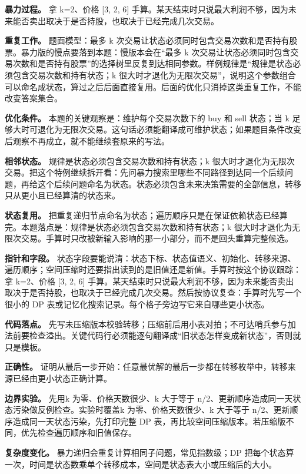\textbf{暴力过程。} 拿 k=2、价格 [3, 2, 6] 手算。某天结束时只说最大利润不够，因为未来能否卖出取决于是否持股，也取决于已经完成几次交易。

\textbf{重复工作。} 题面模型：最多 k 次交易让状态必须同时包含交易次数和是否持有股票。暴力版的慢点要落到本题：慢版本会在“最多 k 次交易让状态必须同时包含交易次数和是否持有股票”的选择树里反复到达相同参数。样例规律是“规律是状态必须包含交易次数和持有状态；k 很大时才退化为无限次交易”，说明这个参数组合可以命名成状态，算过之后后面直接复用。后面的优化只消掉这类重复工作，不能改变答案集合。

\textbf{优化条件。} 本题的关键观察是：维护每个交易次数下的 buy 和 sell 状态；当 k 足够大时可退化为无限次交易。这句话必须能翻译成可维护状态；如果题目条件改变后观察不再成立，就不能继续套原来的写法。

\textbf{相邻状态。} 规律是状态必须包含交易次数和持有状态；k 很大时才退化为无限次交易。把这个特例继续拆开看：先问暴力搜索里哪些不同路径到达同一个后续问题，再给这个后续问题命名为状态。状态必须包含未来决策需要的全部信息，转移只从更小且已经算清的状态来。

\textbf{状态复用。} 把重复递归节点命名为状态；遍历顺序只是在保证依赖状态已经算完。本题落点是：规律是状态必须包含交易次数和持有状态；k 很大时才退化为无限次交易。手算时只改被新输入影响的那一小部分，而不是回头重算完整候选。

\textbf{指针和字段。} 状态字段要能说清：状态下标、状态值语义、初始化、转移来源、遍历顺序；空间压缩时还要指出读到的是旧值还是新值。手算时按这个协议跟踪：拿 k=2、价格 [3, 2, 6] 手算。某天结束时只说最大利润不够，因为未来能否卖出取决于是否持股，也取决于已经完成几次交易。然后按协议复查：手算时先写一个很小的 DP 表或记忆化搜索记录。每个格子旁边写它来自哪些更小状态。

\textbf{代码落点。} 先写未压缩版本校验转移；压缩前后用小表对拍；不可达哨兵参与加法前要检查溢出。关键代码行必须能逐句翻译成“旧状态怎样变成新状态”，否则就只是模板。

\textbf{正确性。} 证明从最后一步开始：任意最优解的最后一步都在转移枚举中，转移来源已经由更小状态正确计算。

\textbf{边界实验。} 先用k 为零、价格天数很少、k 大于等于 n/2、更新顺序造成同一天状态污染做反例检查。实验时覆盖k 为零、价格天数很少、k 大于等于 n/2、更新顺序造成同一天状态污染，先打印完整 DP 表，再比较空间压缩版本。若压缩版不同，优先检查遍历顺序和旧值保存。

\textbf{复杂度变化。} 暴力递归会重复计算相同子问题，常见指数级；DP 把每个状态算一次，时间是状态数乘单个转移成本，空间是状态表大小或压缩后的大小。

